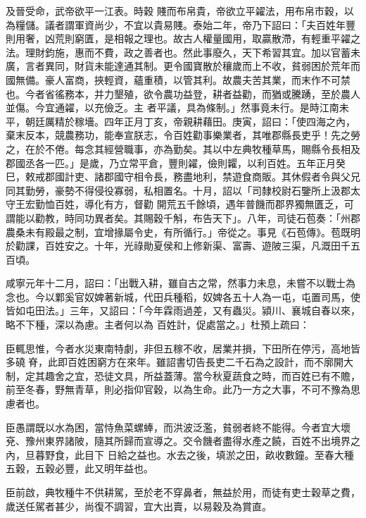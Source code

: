 \begin{pinyinscope}
 及晉受命，武帝欲平一江表。時穀
 賤而布帛貴，帝欲立平糴法，用布帛市穀，以為糧儲。議者謂軍資尚少，不宜以貴易賤。泰始二年，帝乃下詔曰：「夫百姓年豐則用奢，凶荒則窮匱，是相報之理也。故古人權量國用，取贏散滯，有輕重平糴之法。理財鈞施，惠而不費，政之善者也。然此事廢久，天下希習其宜。加以官蓄未廣，言者異同，財貨未能達通其制。更令國寶散於穰歲而上不收，貧弱困於荒年而國無備。豪人富商，挾輕資，蘊重積，以管其利。故農夫苦其業，而末作不可禁也。今者省徭務本，并力墾殖，欲令農功益登，耕者益勸，而猶或騰踴，至於農人並傷。今宜通糴，以充儉乏。主
 者平議，具為條制。」然事竟未行。是時江南未平，朝廷厲精於稼墻。四年正月丁亥，帝親耕藉田。庚寅，詔曰：「使四海之內，棄末反本，競農務功，能奉宣朕志，令百姓勸事樂業者，其唯郡縣長吏乎！先之勞之，在於不倦。每念其經營職事，亦為勤矣。其以中左典牧種草馬，賜縣令長相及郡國丞各一匹。」是歲，乃立常平倉，豐則糴，儉則糶，以利百姓。五年正月癸巳，敕戒郡國計吏、諸郡國守相令長，務盡地利，禁遊食商販。其休假者令與父兄同其勤勞，豪勢不得侵役寡弱，私相置名。十月，詔以「司隸校尉石鑒所上汲郡太守王宏勤恤百姓，導化有方，督勸
 開荒五千餘頃，遇年普饑而郡界獨無匱乏，可謂能以勸教，時同功異者矣。其賜穀千斛，布告天下」。八年，司徒石苞奏：「州郡農桑未有殿最之制，宜增掾屬令史，有所循行。」帝從之。事見《石苞傳》。苞既明於勸課，百姓安之。十年，光祿勛夏侯和上修新渠、富壽、遊陂三渠，凡溉田千五百頃。



 咸寧元年十二月，詔曰：「出戰入耕，雖自古之常，然事力未息，未嘗不以戰士為念也。今以鄴奚官奴婢著新城，代田兵種稻，奴婢各五十人為一屯，屯置司馬，使皆如屯田法。」三年，又詔曰：「今年霖雨過差，又有蟲災。潁川、襄城自春以來，略不下種，深以為慮。主者何以為
 百姓計，促處當之。」杜預上疏曰：



 臣輒思惟，今者水災東南特劇，非但五稼不收，居業并損，下田所在停污，高地皆多磽脊，此即百姓困窮方在來年。雖詔書切告長吏二千石為之設計，而不廓開大制，定其趣舍之宜，恐徒文具，所益蓋薄。當今秋夏蔬食之時，而百姓已有不贍，前至冬春，野無青草，則必指仰官穀，以為生命。此乃一方之大事，不可不豫為思慮者也。



 臣愚謂既以水為困，當恃魚菜螺蜯，而洪波泛濫，貧弱者終不能得。今者宜大壞兗、豫州東界諸陂，隨其所歸而宣導之。交令饑者盡得水產之饒，百姓不出境界之內，旦暮野食，此目下
 日給之益也。水去之後，填淤之田，畝收數鐘。至春大種五穀，五穀必豐，此又明年益也。



 臣前啟，典牧種牛不供耕駕，至於老不穿鼻者，無益於用，而徒有吏士穀草之費，歲送任駕者甚少，尚復不調習，宜大出賣，以易穀及為賞直。




\end{pinyinscope}
